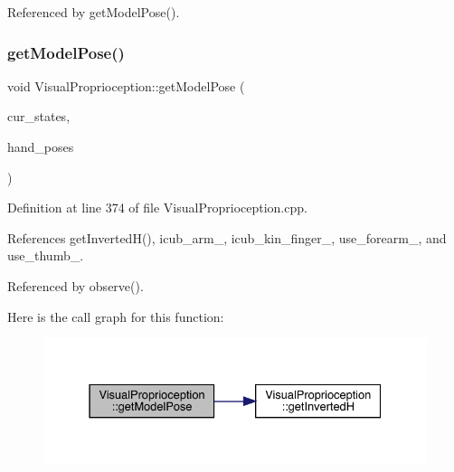 Referenced by get\+Model\+Pose().

\mbox{\label{classVisualProprioception_a06131e57aab757389277f6c06bbd6dc7}} 
\subsubsection{\texorpdfstring{get\+Model\+Pose()}{getModelPose()}}
{\footnotesize\ttfamily void Visual\+Proprioception\+::get\+Model\+Pose (\begin{DoxyParamCaption}\item[{const Eigen\+::\+Ref$<$ const Eigen\+::\+Matrix\+Xf $>$ \&}]{cur\+\_\+states,  }\item[{std\+::vector$<$ Superimpose\+::\+Model\+Pose\+Container $>$ \&}]{hand\+\_\+poses }\end{DoxyParamCaption})\hspace{0.3cm}{\ttfamily [protected]}}



Definition at line 374 of file Visual\+Proprioception.\+cpp.



References get\+Inverted\+H(), icub\+\_\+arm\+\_\+, icub\+\_\+kin\+\_\+finger\+\_\+, use\+\_\+forearm\+\_\+, and use\+\_\+thumb\+\_\+.



Referenced by observe().

Here is the call graph for this function\+:
\nopagebreak
\begin{figure}[H]
\begin{center}
\leavevmode
\includegraphics[width=331pt]{classVisualProprioception_a06131e57aab757389277f6c06bbd6dc7_cgraph}
\end{center}
\end{figure}
\mbox{\label{classVisualProprioception_a1f292b50c80393a45c557f83c82f26fd}} 
